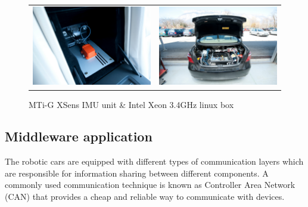 \begin{figure}[h]
   \centering
     \begin{tabular}{lr}
       \includegraphics[width=0.45\columnwidth]{img/testbed:xsens}
       & \includegraphics[width=0.45\columnwidth]{img/testbed:trunc}
     \end{tabular}
   \caption{MTi-G XSens IMU unit \& Intel Xeon 3.4GHz linux box}
   \label{fig:Lexus2}
 \end{figure}





\subsection{Middleware application}

The robotic cars are equipped with different types of communication layers which are responsible for information sharing between different components. A commonly used communication technique is known as Controller Area Network (CAN) that provides a cheap and reliable way to communicate with devices.%

